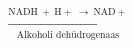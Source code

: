 \documentclass[preview]{standalone}
\begin{document}
\begin{align*}
\xrightarrow[\text{Alkoholi dehüdrogenaas}]{\text{NADH}\:+\:\text{H}+\:\rightarrow\:\text{NAD}+}
\end{align*}
\end{document}

